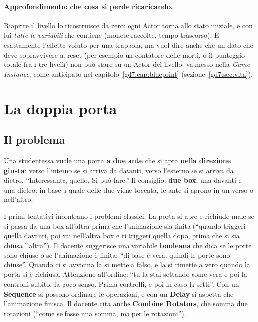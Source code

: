 \paragraph{Approfondimento: che cosa si perde ricaricando.} Riaprire il livello
lo ricostruisce da zero: ogni Actor torna allo stato iniziale, e con lui
\emph{tutte le variabili} che contiene (monete raccolte, tempo trascorso). È
esattamente l'effetto voluto per una trappola, ma vuol dire anche che un dato
che deve sopravvivere al reset (per esempio un contatore delle morti, o il
punteggio totale fra i tre livelli) non può stare su un Actor del livello: va
messo nella \emph{Game Instance}, come anticipato nel
capitolo~\ref{gd7:cap:blueprint} (sezione~\ref{gd7:sec:vita}).

\section{La doppia porta}
\label{gd12:sec:doppia-porta}

\subsection{Il problema}

Una studentessa vuole una porta \textbf{a due ante} che si apra \textbf{nella
direzione giusta}: verso l'interno se si arriva da davanti, verso l'esterno se
si arriva da dietro. ``Interessante, quello. Si può fare.'' Il consiglio:
\textbf{due box}, una davanti e una dietro; in base a quale delle due viene
toccata, le ante si aprono in un verso o nell'altro.

I primi tentativi incontrano i problemi classici. La porta si apre e richiude
male se si passa da una box all'altra prima che l'animazione sia finita
(``quando triggeri quella davanti, poi vai nell'altra box e ti triggeri quella
dopo, prima che si sia chiusa l'altra''). Il docente suggerisce una variabile
\textbf{booleana} che dica se le porte sono chiuse o se l'animazione è finita:
``di base è vera, quindi le porte sono chiuse''. Quando ci si avvicina la si
mette a falso, e la si rimette a vero quando la porta si è richiusa. Attenzione
all'ordine: ``tu la stai settando come vera e poi la controlli subito, fa poco
senso. Prima controlli, e poi in caso la setti''. Con un \textbf{Sequence} si
possono ordinare le operazioni, e con un \textbf{Delay} si aspetta che
l'animazione finisca. Il docente cita anche \textbf{Combine Rotators}, che somma
due rotazioni (``come se fosse una somma, ma per le rotazioni'').

